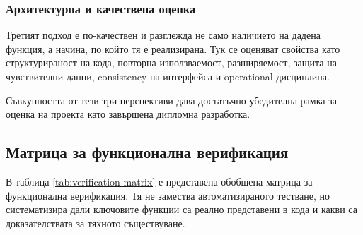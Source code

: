 \subsubsection{Архитектурна и качествена оценка}

Третият подход е по-качествен и разглежда не само наличието на дадена функция, а начина, по който тя е реализирана. Тук се оценяват свойства като структурираност на кода, повторна използваемост, разширяемост, защита на чувствителни данни, consistency на интерфейса и operational дисциплина.

Съвкупността от тези три перспективи дава достатъчно убедителна рамка за оценка на проекта като завършена дипломна разработка.

\subsection{Матрица за функционална верификация}

В таблица \ref{tab:verification-matrix} е представена обобщена матрица за функционална верификация. Тя не замества автоматизираното тестване, но систематизира дали ключовите функции са реално представени в кода и какви са доказателствата за тяхното съществуване.

